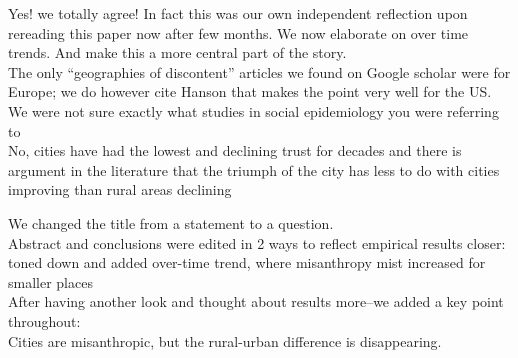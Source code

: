 Yes! we totally agree! In fact this was our own independent reflection upon
rereading this paper now after few months. We now elaborate on over time
trends. And make this a more central part of the story.\\

The only ``geographies of discontent'' articles we found on Google scholar were for Europe; we do however cite Hanson that makes the point very well for the US.\\

We were not sure exactly what studies in social epidemiology you were referring to\\

No, cities have had the lowest and declining trust for decades and
there is argument in the literature that the triumph of the city has less to do
with cities improving than rural areas declining \citep{aokCityBook15}\\



We changed the title from a statement to a question. \\

Abstract and conclusions were edited in 2 ways to reflect empirical
results closer: toned down and added over-time trend, where misanthropy mist
increased for smaller places\\

After having another look and thought about results more--we added a key point throughout:\\

Cities are misanthropic, but the rural-urban difference is disappearing.




\newpage



